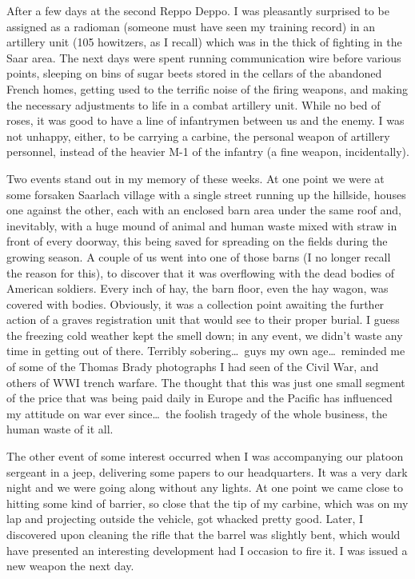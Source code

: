 \documentclass[../m3y]{subfiles}
\begin{document}
After a few days at the second Reppo Deppo. I was pleasantly surprised to be assigned as a radioman (someone must have seen my training record) in an artillery unit (105 howitzers, as I recall) which was in the thick of fighting in the Saar area. The next days were spent running communication wire before various points, sleeping on bins of sugar beets stored in the cellars of the abandoned French homes, getting used to the terrific noise of the firing weapons, and making the necessary adjustments to life in a combat artillery unit. While no bed of roses, it was good to have a line of infantrymen between us and the enemy. I was not unhappy, either, to be carrying a carbine, the personal weapon of artillery personnel, instead of the heavier M-1 of the infantry (a fine weapon, incidentally).

Two events stand out in my memory of these weeks. At one point we were at some forsaken Saarlach village with a single street running up the hillside, houses one against the other, each with an enclosed barn area under the same roof and, inevitably, with a huge mound of animal and human waste mixed with straw in front of every doorway, this being saved for spreading on the fields during the growing season. A couple of us went into one of those barns (I no longer recall the reason for this), to discover that it was overflowing with the dead bodies of American soldiers. Every inch of hay, the barn floor, even the hay wagon, was covered with bodies. Obviously, it was a collection point awaiting the further action of a graves registration unit that would see to their proper burial. I guess the freezing cold weather kept the smell down; in any event, we didn't waste any time in getting out of there. Terribly sobering\ldots\ guys my own age\ldots\ reminded me of some of the Thomas Brady photographs I had seen of the Civil War, and others of WW\thinspace I trench warfare. The thought that this was just one small segment of the price that was being paid daily in Europe and the Pacific has influenced my attitude on war ever since\ldots\ the foolish tragedy of the whole business, the human waste of it all.

The other event of some interest occurred when I was accompanying our platoon sergeant in a jeep, delivering some papers to our headquarters. It was a very dark night and we were going along without any lights. At one point we came close to hitting some kind of barrier, so close that the tip of my carbine, which was on my lap and projecting outside the vehicle, got whacked pretty good. Later, I discovered upon cleaning the rifle that the barrel was slightly bent, which would have presented an interesting development had I occasion to fire it. I was issued a new weapon the next day.
\end{document}
